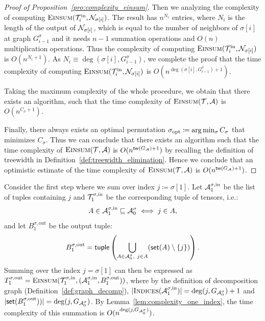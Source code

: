 \documentclass[letterpaper,11pt]{article}
\newcommand{\takesetp}[1]{\mathsf{set}(#1)}
\newcommand{\taketuplep}[1]{\mathsf{tuple}\left( #1 \right)}
\newcommand{\indexset}{\textsc{Indices}}
\newcommand{\tensorcontraction}{\textsc{Einsum}}
\newcommand{\degp}[2]{\deg(#1,#2)}
\newcommand{\treewidthp}[1]{\mathsf{tw}(#1)}
\newcommand{\graphform}[1]{G_{#1}}
\newcommand{\less}{O}
\begin{document}
\begin{bibunit}[plainnat]
\begin{proof}[Proof of Proposition~\ref{pro:complexity_einsum}]
Then we analyzing the complexity of computing $\tensorcontraction(\calT_i^{\mathrm{in}},\calN_{\sigma[i]})$. The result has $n^{N_i}$ entries, where $N_i$ is the length of the output of ${\mathcal{N}}_{\sigma[i]}$, which is equal to the number of neighbors of $\sigma[i]$ at graph $G^\sigma_{i-1}$ and it needs $n-1$ summation operations and $\less(n)$ multiplication operations. Thus the complexity of computing $\tensorcontraction(\calT_i^{\mathrm{in}},\calN_{\sigma[i]})$ is $O(n^{N_i+1})$. As $N_i \equiv \degp{\sigma[i]}{G^\sigma_{i-1}}$, we complete the proof that the time complexity of computing $\tensorcontraction(\calT_i^{\mathrm{in}},\calN_{\sigma[i]})$ is $\less(n^{\degp{\sigma[i]}{G^\sigma_{i-1}}+1})$.

Taking the maximum complexity of the whole procedure, we obtain that there exists an algorithm, such that the time complexity of $\tensorcontraction(\calT, \calA)$ is $\less(n^{C_\sigma + 1})$.

Finally, there always exists an optimal permutation $\sigma_{\rm opt} \coloneqq \arg \min_{\sigma} C_{\sigma}$ that minimizes $C_\sigma$. Thus we can conclude that there exists an algorithm such that the time complexity of $\tensorcontraction(\calT, \calA)$ is $\less(n^{\treewidthp{G_\calA}+1})$ by recalling the definition of treewidth in Definition~\ref{def:treewidth_elimination}. Hence we conclude that an optimistic estimate of the time complexity of $\tensorcontraction(\calT, \calA)$ is $\less(n^{\treewidthp{G_\calA}+1})$.
\end{proof}
\fi
\iffalse
Consider the first step where we sum over index $j \coloneqq \sigma[1]$. Let ${\mathcal{A}}^{\sigma, \mathrm{in}}_{1}$ be the list of tuples containing $j$ and ${\mathcal{T}}^{\sigma, \mathrm{in}}_{1}$ be the corresponding tuple of tensors, i.e.:
    \begin{equation*}
    A \in {\mathcal{A}}^{\sigma, \mathrm{in}}_{1} \sqsubseteq {\mathcal{A}}^{\sigma}_0 \iff j \in A,
    \end{equation*}
    and let $B^{\sigma, \mathrm{out}}_{1}$ be the output tuple: 
    \begin{equation*}
    B^{\sigma, \mathrm{out}}_{1} = \taketuplep{\bigcup_{A \in \calA^{\sigma}_{0},\ j \in A} (\takesetp{A} \setminus \{j\}) }. 
    \end{equation*}
    Summing over the index $j = \sigma[1]$ can then be expressed as $T^{\sigma,\mathrm{out}}_{1} = \tensorcontraction(\calT^{\sigma, \mathrm{in}}_{1}, (\calA^{\sigma, \mathrm{in}}_{1}, B^{\sigma, \mathrm{out}}_{1}))$, where by the definition of decomposition graph (Definition~\ref{def:graph_decomp}), $|\indexset(\calA^{\sigma, \mathrm{in}}_{1})| = \degp{j}{\graphform{\calA^{\sigma}_0}} + 1$ and $|\takesetp{B^{\sigma, \mathrm{out}}_{1})}| = \degp{j}{\graphform{\calA^{\sigma}_0}}$. By Lemma~\ref{lem:complexity_one_index}, the time complexity of this summation is $\less(n^{\degp{j}{\graphform{\calA^{\sigma}_0}}} )$. 
    

\end{bibunit}
\end{document}
